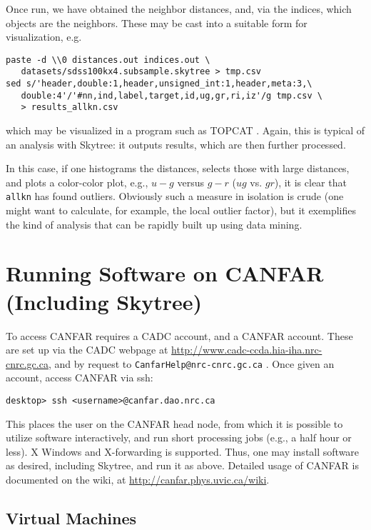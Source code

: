 Once run, we have obtained the neighbor distances, and, via the indices, which objects are the neighbors. These may be cast into a suitable form for visualization, e.g.

\begin{verbatim}
paste -d \\0 distances.out indices.out \
   datasets/sdss100kx4.subsample.skytree > tmp.csv
sed s/'header,double:1,header,unsigned_int:1,header,meta:3,\
   double:4'/'#nn,ind,label,target,id,ug,gr,ri,iz'/g tmp.csv \
   > results_allkn.csv
\end{verbatim}

\noindent which may be visualized in a program such as TOPCAT 
 \citep{taylor:topcat}. Again, this is typical of an analysis with Skytree: it outputs results, which are then further processed.

In this case, if one histograms the distances, selects those with large distances, and plots a color-color plot, e.g., $u-g$ versus $g-r$ ($ug$ vs. $gr$), it is clear that {\tt allkn} has found outliers. Obviously such a measure in isolation is crude (one might want to calculate, for example, the local outlier factor), but it exemplifies the kind of analysis that can be rapidly built up using data mining.

\section{Running Software on CANFAR (Including Skytree)}

To access CANFAR requires a CADC account, and a CANFAR account. These are set up via the CADC webpage at \url{http://www.cadc-ccda.hia-iha.nrc-cnrc.gc.ca}, and by request to {\tt CanfarHelp@nrc-cnrc.gc.ca} . Once given an account, access CANFAR via ssh:

\begin{verbatim}
desktop> ssh <username>@canfar.dao.nrc.ca
\end{verbatim}

This places the user on the CANFAR head node, from which it is possible to utilize software interactively, and run short processing jobs (e.g., a half hour or less). X Windows and X-forwarding is supported. Thus, one may install software as desired, including Skytree, and run it as above. Detailed usage of CANFAR is documented on the wiki, at \url{http://canfar.phys.uvic.ca/wiki}.

\subsection{Virtual Machines}

